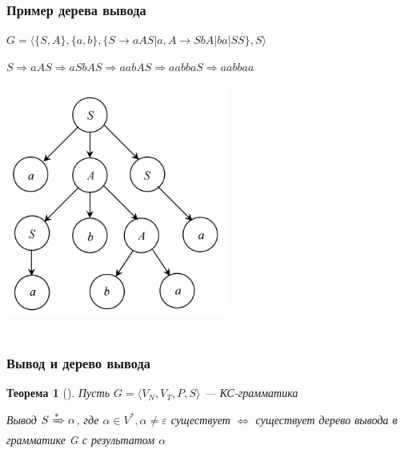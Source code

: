 \documentclass{beamer}
\newtheorem{rutheorem}{Теорема}
\begin{document}
\begin{frame}[fragile]
  \transwipe[direction=90]
  \frametitle{Пример дерева вывода}
\begin{centering}

$G = \langle \{ S, A \}, \{ a, b \}, \{ S \rightarrow a A S | a, A \rightarrow S b A | b a | SS \}, S\rangle$  

$S \Rightarrow aAS \Rightarrow a S b A S \Rightarrow a a b A S \Rightarrow a a b b a S \Rightarrow a a b b a a$
    
  \includegraphics[width=0.55\textwidth]{pics/tree.png}  \\~\\     \pause

\end{centering}
\end{frame}

\begin{frame}[fragile]
  \transwipe[direction=90]
  \frametitle{Вывод и дерево вывода}
  \begin{rutheorem}[]
    Пусть $G = \langle V_N, V_T, P, S \rangle$ --- КС-грамматика
    
    Вывод $S \xRightarrow[]{*} \alpha$, где $\alpha \in V^*, \alpha \neq \varepsilon$ существует $\Leftrightarrow$ существует дерево вывода в грамматике G с результатом $\alpha$
  \end{rutheorem}

\end{frame}
\end{document}
